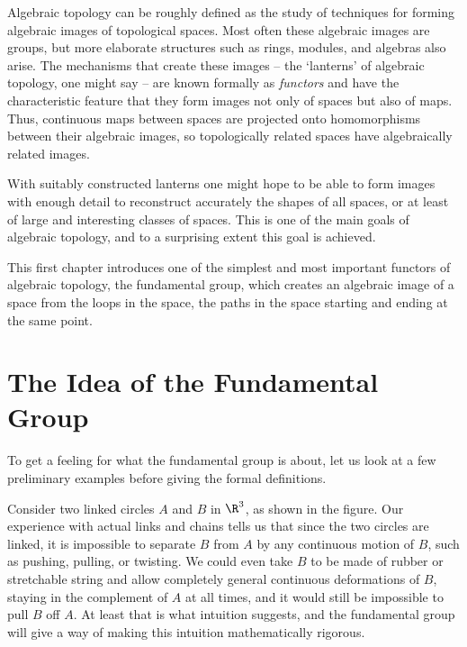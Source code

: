 
Algebraic topology can be roughly defined as the study of techniques for forming
algebraic images of topological spaces. Most often these algebraic images are groups,
but more elaborate structures such as rings, modules, and algebras also arise. The
mechanisms that create these images -- the `lanterns' of algebraic topology, one might
say -- are known formally as \textit{functors} and have the characteristic feature that they
form images not only of spaces but also of maps. Thus, continuous maps between
spaces are projected onto homomorphisms between their algebraic images, so
topologically related spaces have algebraically related images.

With suitably constructed lanterns one might hope to be able to form images with
enough detail to reconstruct accurately the shapes of all spaces, or at least of large
and interesting classes of spaces. This is one of the main goals of algebraic topology,
and to a surprising extent this goal is achieved.

This first chapter introduces one of the simplest and most important functors
of algebraic topology, the fundamental group, which creates an algebraic image of a
space from the loops in the space, the paths in the space starting and ending at the
same point.

\section*{The Idea of the Fundamental Group}

To get a feeling for what the fundamental group is about, let us look at a few
preliminary examples before giving the formal definitions.

Consider two linked circles $A$ and $B$ in $\R^3$, as shown in the figure. Our experience
with actual links and chains tells us that since the two circles are linked, it is impossible
to separate $B$ from $A$ by any continuous motion of $B$, such as pushing, pulling, or
twisting. We could even take $B$ to be made of rubber or stretchable string and allow
completely general continuous deformations of $B$, staying in the complement of $A$
at all times, and it would still be impossible to pull $B$ off $A$. At least that is what
intuition suggests, and the fundamental group will give a way of making this intuition
mathematically rigorous.



